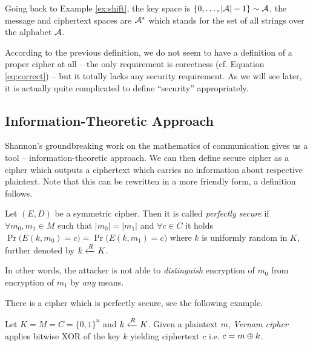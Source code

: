 \begin{note}
	Going back to Example \ref{ex:shift}, the key space is $\{0 , \ldots , |{\cal A}|-1\}\sim\cal A$, the message and ciphertext spaces are ${\cal A}^*$ which stands for the set of all strings over the alphabet $\cal A$.
\end{note}

According to the previous definition, we do not seem to have a definition of a proper cipher at all -- the only requirement is corectness (cf. Equation \ref{eq:correct}) -- but it totally lacks any security requirement. As we will see later, it is actually quite complicated to define ``security'' appropriately.



\subsection{Information-Theoretic Approach}

Shannon's groundbreaking work \cite{shannon1949mathematical} on the mathematics of communication gives us a tool -- information-theoretic approach. We can then define secure cipher as a cipher which outputs a ciphertext which carries no information about respective plaintext. Note that this can be rewritten in a more friendly form, a definition follows.

\begin{defn}
\label{def:perfsec}
	Let $(E,D)$ be a symmetric cipher. Then it is called {\em perfectly secure} if $\forall m_0,m_1\in M$ such that $|m_0| = |m_1|$ and $\forall c\in C$ it holds $\Pr\bigl(E(k,m_0)=c\bigr) = \Pr\bigl(E(k,m_1)=c\bigr)$ where $k$ is uniformly random in $K$, further denoted by $k\xleftarrow{R} K$.
\end{defn}

\begin{note}
\label{note:indist}
	In other words, the attacker is not able to {\em distinguish} encryption of $m_0$ from encryption of $m_1$ by {\em any} means.
\end{note}

There is a cipher which is perfectly secure, see the following example.

\begin{example}
	Let $K = M = C = \{0,1\}^n$ and $k\xleftarrow{R} K$. Given a plaintext $m$, {\em Vernam cipher} applies bitwise XOR of the key $k$ yielding ciphertext $c$ i.e. $c = m\oplus k$.
\end{example}

